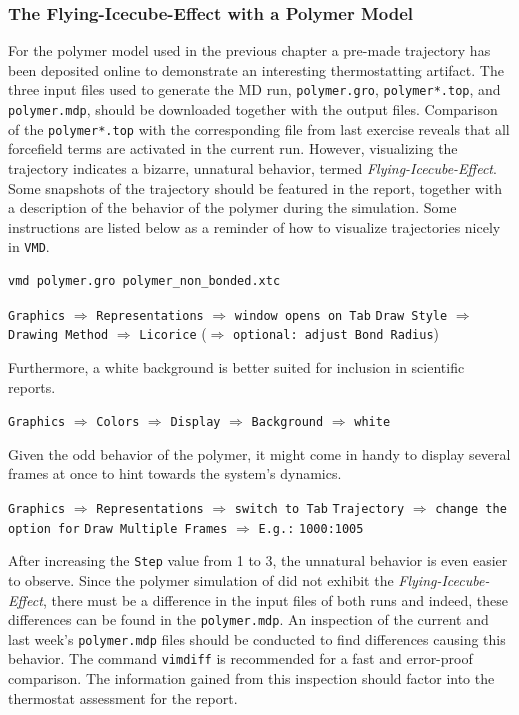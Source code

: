 \documentclass[9pt,tutorial]{livecoms}
\newcommand{\code}[1]{\colorbox{light-gray}{\texttt{#1}}}
\begin{document}
\subsubsection*{The Flying-Icecube-Effect with a Polymer Model}
For the polymer model used in the previous chapter a pre-made trajectory has been deposited online to demonstrate an interesting thermostatting artifact. The three input files used to generate the MD run, \code{polymer.gro}, \code{polymer*.top}, and \code{polymer.mdp}, should be downloaded together with the output files. Comparison of the \code{polymer*.top} with the corresponding file from last exercise reveals that all forcefield terms are activated in the current run. However, visualizing the trajectory indicates a bizarre, unnatural behavior, termed \textit{Flying-Icecube-Effect}. Some snapshots of the trajectory should be featured in the report, together with a description of the behavior of the polymer during the simulation. Some instructions are listed below as a reminder of how to visualize trajectories nicely in \texttt{VMD}.
\begin{lstlisting}[language=bash]
vmd polymer.gro polymer_non_bonded.xtc
\end{lstlisting}
\begin{center}
\code{Graphics} $\Rightarrow$ \code{Representations} $\Rightarrow$ \texttt{window opens on Tab} \code{Draw Style} $\Rightarrow$ \code{Drawing Method} $\Rightarrow$ \code{Licorice} ($\Rightarrow$ \texttt{optional: adjust Bond Radius})
\end{center}
Furthermore, a white background is better suited for inclusion in scientific reports.
\begin{center}
\code{Graphics} $\Rightarrow$ \code{Colors} $\Rightarrow$ \code{Display} $\Rightarrow$ \code{Background} $\Rightarrow$ \code{white}
\end{center}
Given the odd behavior of the polymer, it might come in handy to display several frames at once to hint towards the system's dynamics.
\begin{center}
\code{Graphics} $\Rightarrow$ \code{Representations} $\Rightarrow$ \texttt{switch to Tab} \code{Trajectory} $\Rightarrow$ \texttt{change the option for} \code{Draw Multiple Frames} $\Rightarrow$ \texttt{E.g.:} \code{1000:1005}
\end{center}
After increasing the \texttt{Step} value from 1 to 3, the unnatural behavior is even easier to observe. Since the polymer simulation of  did not exhibit the \textit{Flying-Icecube-Effect}, there must be a difference in the input files of both runs and indeed, these differences can be found in the \code{polymer.mdp}. An inspection of the current and last week's \code{polymer.mdp} files should be conducted to find differences causing this behavior. The command \code{vimdiff} is recommended for a fast and error-proof comparison. The information gained from this inspection should factor into the thermostat assessment for the report.
\end{document}
